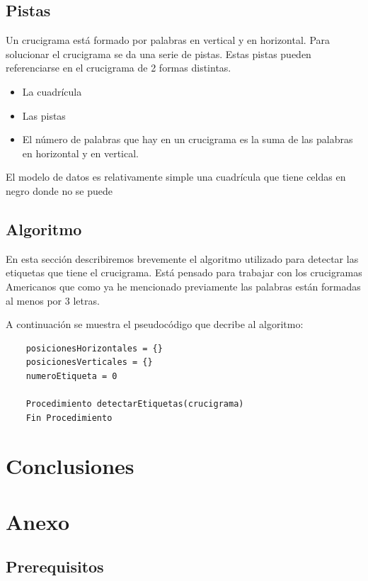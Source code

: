 \documentclass[12pt, a4paper]{article}
\begin{document}
\subsection{Pistas}

Un crucigrama está formado por palabras en vertical y en horizontal. Para
solucionar el crucigrama se da una serie de pistas. Estas pistas pueden
referenciarse en el crucigrama de 2 formas distintas.



\begin{itemize}
	\item La cuadrícula
	\item Las pistas
	\item El número de palabras que hay en un crucigrama es la suma de
	las palabras en horizontal y en vertical.
\end{itemize}


El modelo de datos es relativamente simple una cuadrícula que tiene celdas
en negro donde no se puede

\subsection{Algoritmo}

En esta sección describiremos brevemente el algoritmo utilizado para detectar
las etiquetas que tiene el crucigrama. Está pensado para trabajar
con los crucigramas Americanos \cite{XwordRules} que como ya he mencionado
previamente las palabras están formadas al menos por 3 letras.

A continuación se muestra el pseudocódigo \cite{pseudocode} que decribe al
algoritmo:

\begin{verbatim}
	posicionesHorizontales = {}
	posicionesVerticales = {}
	numeroEtiqueta = 0
	
	Procedimiento detectarEtiquetas(crucigrama)
	Fin Procedimiento
\end{verbatim}

\section{Conclusiones}

\section{Anexo}

\subsection{Prerequisitos}
\end{document}
